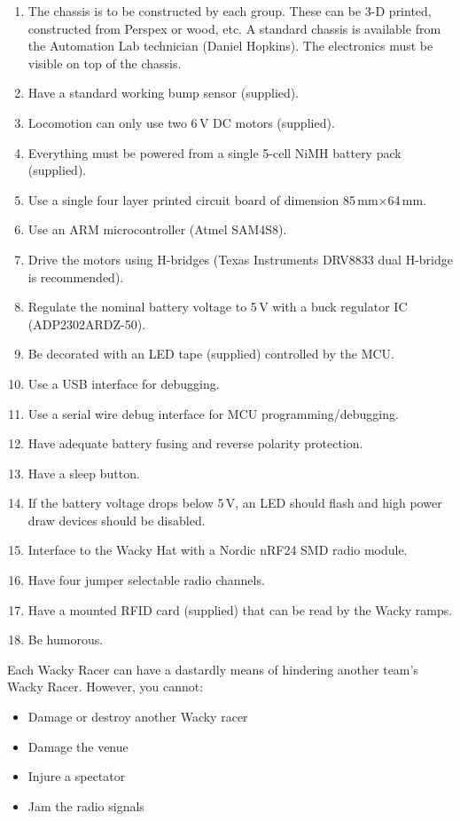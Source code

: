 \documentclass[11pt, a4paper]{article}
\begin{document}
\begin{enumerate}
\item The chassis is to be constructed by each group.  These can be
  3-D printed, constructed from Perspex or wood, etc.  A standard
  chassis is available from the Automation Lab technician (Daniel
  Hopkins).  The electronics must be visible on top of the chassis.
\item Have a standard working bump sensor (supplied).  
\item Locomotion can only use two 6\,V DC motors (supplied).
\item Everything must be powered from a single 5-cell NiMH battery pack (supplied).
\item Use a single four layer printed circuit board of dimension 85\,mm$\times$64\,mm.
\item Use an ARM microcontroller (Atmel SAM4S8).
\item Drive the motors using H-bridges (Texas Instruments DRV8833 dual
  H-bridge is recommended).
\item Regulate the nominal battery voltage to 5\,V with a buck
  regulator IC (ADP2302ARDZ-50).
\item Be decorated with an LED tape (supplied) controlled by the MCU.
\item Use a USB interface for debugging.
\item Use a serial wire debug interface for MCU programming/debugging.
\item Have adequate battery fusing and reverse polarity protection.
\item Have a sleep button.
\item If the battery voltage drops below 5\,V, an LED should flash and high power draw devices should be disabled.
\item Interface to the Wacky Hat with a Nordic nRF24 SMD radio module.
\item Have four jumper selectable radio channels.  
\item Have a mounted RFID card (supplied) that can be read by the Wacky ramps.
\item Be humorous.    
\end{enumerate}


Each Wacky Racer can have a dastardly means of hindering another
team's Wacky Racer.  However, you cannot:
%
\begin{itemize}
\item Damage or destroy another Wacky racer
\item Damage the venue
\item Injure a spectator
\item Jam the radio signals  
\end{itemize}
\end{document}
